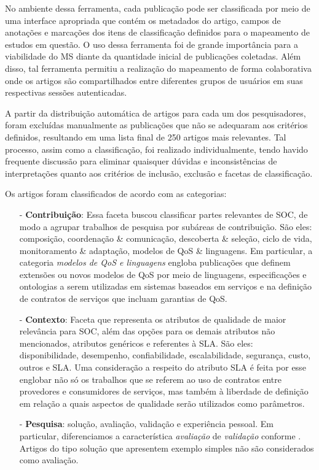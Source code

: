 No ambiente dessa ferramenta, cada publicação pode ser classificada por meio de uma interface apropriada que contém os metadados do artigo, campos de anotações e marcações dos itens de classificação definidos para o mapeamento de estudos em questão. O uso dessa ferramenta foi de grande importância para a viabilidade do MS diante da quantidade inicial de publicações coletadas. Al\'{e}m disso, tal ferramenta permitiu 
a realiza\c{c}\~{a}o do mapeamento de forma colaborativa onde os artigos s\~{a}o compartilhados entre diferentes grupos de usuários em suas respectivas sess\~{o}es autenticadas.

A partir da distribuição automática de artigos para cada um dos pesquisadores, foram excluídas manualmente as publicações que não se adequaram aos critérios definidos, resultando em uma lista final de 250 artigos mais relevantes. Tal processo, assim como a classificação, foi realizado individualmente, tendo havido frequente discussão para eliminar quaisquer dúvidas e inconsistências de interpretações quanto aos critérios de inclusão, exclusão e facetas de classificação. 

Os artigos foram classificados de acordo com as categorias:
\begin{itemize}
\item[-] \textbf{Contribuição}: Essa faceta buscou classificar partes relevantes de SOC, de modo a agrupar trabalhos de pesquisa por subáreas de contribuição. São eles: composição, coordenação \& comunicação, descoberta \& seleção, ciclo de vida, monitoramento \& adaptação, modelos de QoS \& linguagens. Em particular, a categoria \emph{modelos de QoS e linguagens} engloba publicações que definem extensões ou novos modelos de QoS por meio de linguagens, especificações e ontologias a serem utilizadas em sistemas baseados em serviços e na definição de contratos de serviços que incluam garantias de QoS.
\item[-] \textbf{Contexto}: Faceta que representa os atributos de qualidade de maior relevância para SOC, além das opções para os demais atributos não mencionados, atributos genéricos e referentes à SLA. São eles: disponibilidade, desempenho, confiabilidade, escalabilidade, segurança, custo, outros e SLA. Uma consideração a respeito do atributo SLA é feita por esse englobar não só os trabalhos que se referem ao uso de contratos entre provedores e consumidores de serviços, mas também à liberdade de definição em relação a quais aspectos de qualidade serão utilizados como parâmetros.
\item[-] \textbf{Pesquisa}: solução, avaliação, validação e experiência pessoal. Em particular, diferenciamos a caracter\'{i}stica \emph{avalia\c{c}\~{a}o} de \emph{valida\c{c}\~{a}o} conforme \cite{Wieringa:10.1007/s00766-005-0021-6}. Artigos do tipo solução que apresentem exemplo simples não são considerados como avaliação.
\end{itemize}


